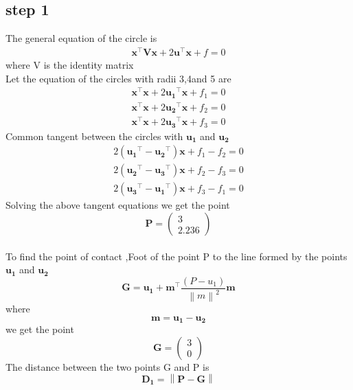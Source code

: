 \documentclass[10pt, a4paper]{article}
\providecommand{\norm}[1]{\left\lVert#1\right\rVert}
\newcommand{\myvec}[1]{\ensuremath{\begin{pmatrix}#1\end{pmatrix}}}
\let\vec\mathbf
\begin{document}
\subsection*{\large step 1}
The general equation of the circle is
\begin{align}
\vec{x}^{\top}\vec{V}\vec{x}+2\vec{u}^{\top}\vec{x}+f=0
\end{align}
where V is the identity matrix
\\Let the equation of the circles with radii 3,4and 5 are 
\begin{align}
\vec{x}^{\top}\vec{x}+2\vec{u_1}^{\top}\vec{x}+f_1=0
\end{align}
\begin{align}
\vec{x}^{\top}\vec{x}+2\vec{u_2}^{\top}\vec{x}+f_2=0
\end{align}
\begin{align}
\vec{x}^{\top}\vec{x}+2\vec{u_3}^{\top}\vec{x}+f_3=0
\end{align}
Common tangent between the circles with $\vec{u_1}$ and $\vec{u_2}$
\begin{align}
2(\vec{u_1}^{\top}-\vec{u_2}^{\top})\vec{x}+f_1-f_2=0
\end{align}
\begin{align}
2(\vec{u_2}^{\top}-\vec{u_3}^{\top})\vec{x}+f_2-f_3=0
\end{align}
\begin{align}
2(\vec{u_3}^{\top}-\vec{u_1}^{\top})\vec{x}+f_3-f_1=0
\end{align}
Solving the above tangent equations we get the  point 
\begin{equation}
\vec{P}=\myvec{3\\2.236}
\end{equation}
\\To find the point of contact ,Foot of the point P to the line formed by the points $\vec{u_1}$ and $\vec{u_2}$
\begin{equation}
\vec{G}=\vec{u_1}+\vec{m}^{\top}\frac{(P-u_1)}{\norm{m}^{2}}\vec{m}
\end{equation}
where
\begin{equation}
\vec{m}=\vec{u_1}-\vec{u_2}
\end{equation}
we get the point 
\begin{equation}
\vec{G}=\myvec{3\\0}
\end{equation}
The distance between the two points G and P is 
\begin{equation}
\vec{D_1} =\norm{\vec{P}-\vec{G}}
\end{equation}
\end{document}
